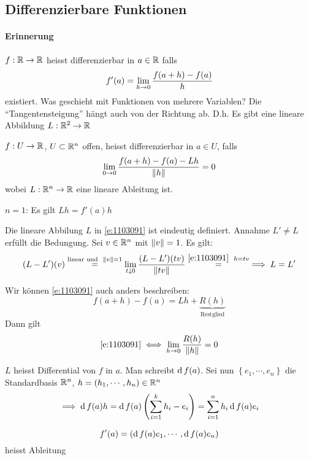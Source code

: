 \subsection{Differenzierbare Funktionen}
\paragraph{Erinnerung} $f:\mathbb{R}\rightarrow \mathbb{R}$ heisst differenzierbar in $a\in \mathbb{R}$ falls
\[f'(a)=\displaystyle\lim_{h\rightarrow0}\frac{f(a+h)-f(a)}{h}\]
existiert. Was geschieht mit Funktionen von mehrere Variablen? Die ``Tangentensteigung'' hängt auch von der Richtung ab. D.h. Es gibt eine lineare Abbildung $L:\mathbb{R}^2\rightarrow\mathbb{R}$
\begin{Def}
  $f:U\rightarrow\mathbb{R}$, $U\subset\mathbb{R}^n$ offen, heisst differenzierbar in $a\in U$, falls
  \begin{equation}
    \label{e:1103091}
    \displaystyle\lim_{0\rightarrow0}\frac{f(a+h)-f(a)-Lh}{\left\| h \right\|}=0
  \end{equation}
  wobei $L:\mathbb{R}^n\rightarrow\mathbb{R}$ eine lineare Ableitung ist.
\end{Def}
\begin{Bem}
  $n=1$: Es gilt $Lh = f'(a)h$
\end{Bem}
\begin{Bem}
  Die lineare Abbilung $L$ in \ref{e:1103091} ist eindeutig definiert. Annahme $L'\neq L$ erfüllt die Bedungung. Sei $v\in\mathbb{R}^n$ mit $\left\| v \right\|=1$. Es gilt:
  \[(L-L')(v)\stackrel{\text{linear und}\hspace{2mm} \left\| v \right\|=1}{=}\lim_{t\downarrow 0}\frac{(L-L')(tv)}{\left\| tv \right\|}\stackrel{\ref{e:1103091}\hspace{2mm} h=tv}{=}\implies L=L'\]
\end{Bem}
\begin{Bem}
  Wir können \ref{e:1103091} auch anders beschreiben:
  \[f(a+h)-f(a)=Lh+\underbrace{R(h)}_{\text{Restglied}}\]
  Dann gilt
  \begin{equation}
    \label{e:1103092}
    \ref{e:1103091} \iff \displaystyle\lim_{h\rightarrow0}\frac{R(h)}{\left\| h \right\|}=0
  \end{equation}
\end{Bem}
\begin{Def}
  $L$ heisst Differential von $f$ in $a$. Man schreibt $\operatorname{d} f(a)$. Sei nun $\left\{ e_1,\cdots,e_n \right\}$ die Standardbasis $\mathbb{R}^n$, $h=(h_1,\cdots,h_n)\in\mathbb{R}^n$
  \[\implies \operatorname{d} f(a)h=\operatorname{d} f(a)\left( \sum_{i=1}^kh_i-e_i \right)=\sum_{i=1}^nh_i\operatorname{d} f(a)e_i\]
\end{Def}
\begin{Def}
  \[f'(a)=(\operatorname{d} f(a)e_1,\cdots,\operatorname{d} f(a)e_n)\]
  heisst Ableitung
\end{Def}
